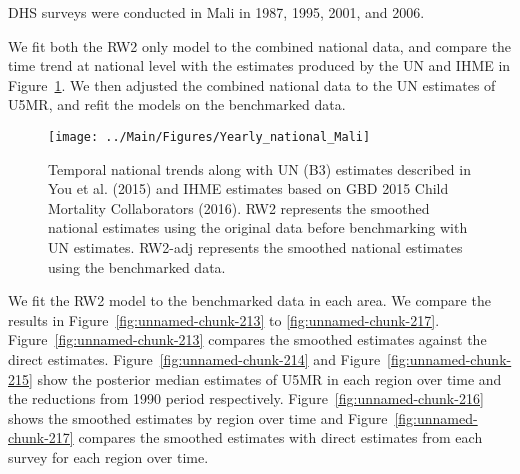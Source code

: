 \documentclass[12pt]{article}\usepackage[]{graphicx}\usepackage[]{color}
\newenvironment{knitrout}{}{} %
\begin{document}


DHS surveys were conducted in Mali in 1987, 1995, 2001, and 2006.

We fit both the RW2 only model to the combined national data, and compare the time trend at national level with the estimates produced by the UN and IHME in Figure~\ref{fig:unnamed-chunk-212}. We then adjusted the combined national data to the UN estimates of U5MR, and refit the models on the benchmarked data. 

\begin{knitrout}
\color{fgcolor}\begin{figure}[bht]

{\centering \texttt{[image: ../Main/Figures/Yearly\_national\_Mali]} 

}

\caption[Temporal national trends along with UN (B3) estimates described in You et al]{Temporal national trends along with UN (B3) estimates described in You et al. (2015) and IHME estimates based on GBD 2015 Child Mortality Collaborators (2016). RW2 represents the smoothed national estimates using the original data before benchmarking with UN estimates. RW2-adj represents the smoothed national estimates using the benchmarked data.}\label{fig:unnamed-chunk-212}
\end{figure}


\end{knitrout}
 

We fit the RW2 model to the benchmarked data in each area. 
We compare the results in Figure~\ref{fig:unnamed-chunk-213} to \ref{fig:unnamed-chunk-217}.
Figure~\ref{fig:unnamed-chunk-213} compares the smoothed estimates against the direct estimates. Figure~\ref{fig:unnamed-chunk-214} and Figure~\ref{fig:unnamed-chunk-215} show the posterior median estimates of U5MR in each region over time and the reductions from 1990 period respectively.
Figure~\ref{fig:unnamed-chunk-216} shows the smoothed estimates by region over time and Figure~\ref{fig:unnamed-chunk-217} compares the smoothed estimates with direct estimates from each survey for each region over time.


\end{document}
